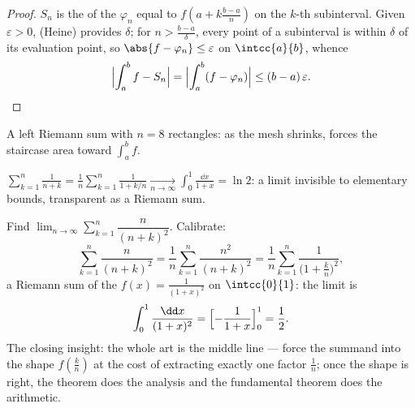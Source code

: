 \begin{proof}
$S_n$ is the  of the  $\varphi_n$ equal to
$f(a + k\frac{b-a}{n})$ on the $k$-th subinterval. Given
$\varepsilon > 0$,  (Heine) provides $\delta$; for
$n > \frac{b-a}{\delta}$, every point of a subinterval is within
$\delta$ of its evaluation point, so $\abs{f - \varphi_n} \leq
\varepsilon$ on $\intcc{a}{b}$, whence
\[
\Bigl| \int_a^b f - S_n \Bigr|
= \Bigl| \int_a^b (f - \varphi_n) \Bigr|
\leq (b-a)\,\varepsilon . \qedhere
\]
\end{proof}

\begin{omfigure}

{\small A left Riemann sum with $n = 8$ rectangles: as the mesh
shrinks,  forces the staircase area toward
$\int_a^b f$.}
\end{omfigure}

\begin{example}\label{ex:b1:integration:riemannexample}
$\displaystyle\sum_{k=1}^{n} \frac{1}{n + k} = \frac 1n
\sum_{k=1}^{n} \frac{1}{1 + k/n} \xrightarrow[n\to\infty]{}
\int_0^1 \frac{\dd x}{1 + x} = \ln 2$: a limit invisible to
elementary bounds, transparent as a Riemann sum.
\end{example}

\begin{example}\label{ex:b1:integration:riemann2}
Find $\lim_{n\to\infty} \sum_{k=1}^{n} \dfrac{n}{(n+k)^2}$.
Calibrate:
\[
\sum_{k=1}^{n} \frac{n}{(n+k)^2}
= \frac{1}{n}\sum_{k=1}^{n} \frac{n^2}{(n+k)^2}
= \frac1n \sum_{k=1}^{n} \frac{1}{\bigl(1 + \frac kn\bigr)^2} ,
\]
a Riemann sum of the  $f(x) = \frac{1}{(1+x)^2}$ on
$\intcc{0}{1}$: the limit is
\[
\int_0^1 \frac{\dd x}{(1 + x)^2}
= \Bigl[-\frac{1}{1+x}\Bigr]_0^1 = \frac12 .
\]
The closing insight: the whole art is the middle line ---
force the summand into the shape $f(\frac kn)$ at the cost of
extracting exactly one factor $\frac1n$; once the shape is
right, the theorem does the analysis and the fundamental theorem
does the arithmetic.
\end{example}

